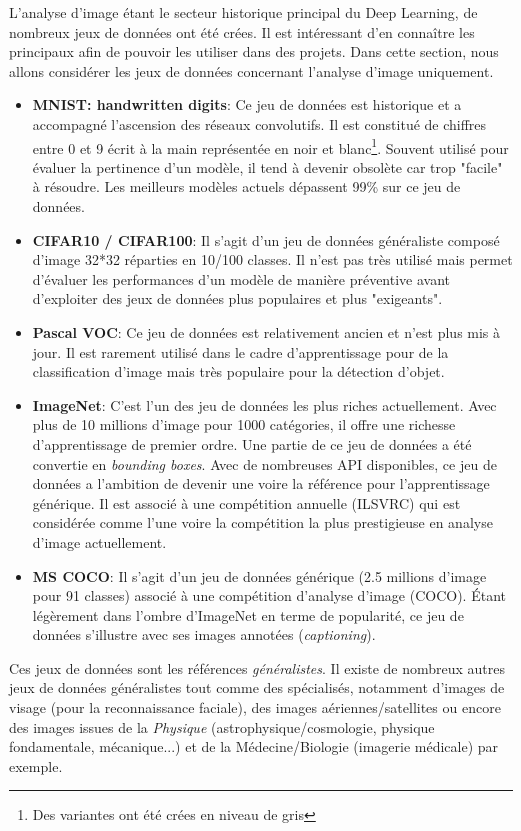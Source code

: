 \noindent L'analyse d'image étant le secteur historique principal du Deep Learning, de nombreux jeux de données ont été crées. Il est intéressant d'en connaître les principaux afin de pouvoir les utiliser dans des projets. Dans cette section, nous allons considérer les jeux de données concernant l'analyse d'image uniquement.
\begin{itemize}
    \item \textbf{MNIST: handwritten digits}\cite{mnist}: Ce jeu de données est historique et a accompagné l'ascension des réseaux convolutifs. Il est constitué de chiffres entre 0 et 9 écrit à la main représentée en noir et blanc\footnote{Des variantes ont été crées en niveau de gris}. Souvent utilisé pour évaluer la pertinence d'un modèle, il tend à devenir obsolète car trop "facile" à résoudre. Les meilleurs modèles actuels dépassent 99\% sur ce jeu de données.
    \item \textbf{CIFAR10 / CIFAR100}\cite{cifar10}\cite{cifar100}: Il s'agit d'un jeu de données généraliste composé d'image 32*32 réparties en 10/100 classes. Il n'est pas très utilisé mais permet d'évaluer les performances d'un modèle de manière préventive avant d'exploiter des jeux de données plus populaires et plus "exigeants".
    \item \textbf{Pascal VOC}\cite{pascal}: Ce jeu de données est relativement ancien et n'est plus mis à jour. Il est rarement utilisé dans le cadre d'apprentissage pour de la classification d'image mais très populaire pour la détection d'objet.
    \item \textbf{ImageNet}\cite{imagenet}: C'est l'un des jeu de données les plus riches actuellement. Avec plus de 10 millions d'image pour 1000 catégories, il offre une richesse d'apprentissage de premier ordre. Une partie de ce jeu de données a été convertie en \textit{bounding boxes}. Avec de nombreuses API disponibles, ce jeu de données a l'ambition de devenir une voire la référence pour l'apprentissage générique. Il est associé à une compétition annuelle (ILSVRC) qui est considérée comme l'une voire la compétition la plus prestigieuse en analyse d'image actuellement.
    \item\textbf{MS COCO}\cite{coco}: Il s'agit d'un jeu de données générique (2.5 millions d'image pour 91 classes) associé à une compétition d'analyse d'image (COCO). Étant légèrement dans l'ombre d'ImageNet en terme de popularité, ce jeu de données s'illustre avec ses images annotées (\textit{captioning}).
\end{itemize}

\noindent Ces jeux de données sont les références \textit{généralistes}. Il existe de nombreux autres jeux de données généralistes tout comme des spécialisés, notamment d'images de visage (pour la reconnaissance faciale), des images aériennes/satellites ou encore des images issues de la \textit{Physique} (astrophysique/cosmologie, physique fondamentale, mécanique...) et de la Médecine/Biologie (imagerie médicale) par exemple.
